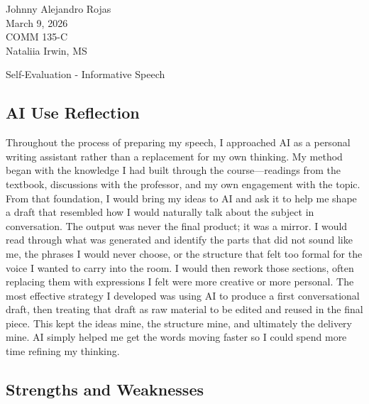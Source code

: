 \documentclass[12pt]{article}
\begin{document}
\noindent
Johnny Alejandro Rojas\\
March 9, 2026\\
COMM 135-C\\
Nataliia Irwin, MS

\vspace{1em}

\begin{center}
Self-Evaluation - Informative Speech
\end{center}

\subsection*{AI Use Reflection}

Throughout the process of preparing my speech, I approached AI as a personal writing assistant rather than a replacement for my own thinking. My method began with the knowledge I had built through the course—readings from the textbook, discussions with the professor, and my own engagement with the topic. From that foundation, I would bring my ideas to AI and ask it to help me shape a draft that resembled how I would naturally talk about the subject in conversation. The output was never the final product; it was a mirror. I would read through what was generated and identify the parts that did not sound like me, the phrases I would never choose, or the structure that felt too formal for the voice I wanted to carry into the room. I would then rework those sections, often replacing them with expressions I felt were more creative or more personal. The most effective strategy I developed was using AI to produce a first conversational draft, then treating that draft as raw material to be edited and reused in the final piece. This kept the ideas mine, the structure mine, and ultimately the delivery mine. AI simply helped me get the words moving faster so I could spend more time refining my thinking.

\subsection*{Strengths and Weaknesses}
\end{document}
